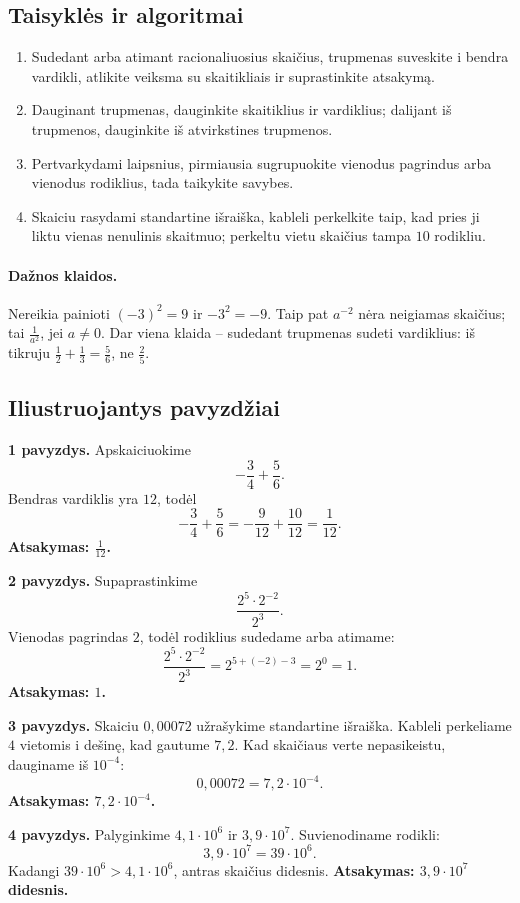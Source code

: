 \subsection{Taisyklės ir algoritmai}
\begin{enumerate}[label=\arabic*.]
\item Sudedant arba atimant racionaliuosius skaičius, trupmenas suveskite i bendra vardikli, atlikite veiksma su skaitikliais ir suprastinkite atsakymą.
\item Dauginant trupmenas, dauginkite skaitiklius ir vardiklius; dalijant iš trupmenos, dauginkite iš atvirkstines trupmenos.
\item Pertvarkydami laipsnius, pirmiausia sugrupuokite vienodus pagrindus arba vienodus rodiklius, tada taikykite savybes.
\item Skaiciu rasydami standartine išraiška, kableli perkelkite taip, kad pries ji liktu vienas nenulinis skaitmuo; perkeltu vietu skaičius tampa $10$ rodikliu.
\end{enumerate}
\paragraph{Dažnos klaidos.}
Nereikia painioti $(-3)^2=9$ ir $-3^2=-9$. Taip pat $a^{-2}$ nėra neigiamas skaičius; tai $\frac{1}{a^2}$, jei $a\ne0$. Dar viena klaida -- sudedant trupmenas sudeti vardiklius: iš tikruju $\frac12+\frac13=\frac56$, ne $\frac25$.

\subsection{Iliustruojantys pavyzdžiai}
\textbf{1 pavyzdys.} Apskaiciuokime
\[
-\frac34+\frac56.
\]
Bendras vardiklis yra $12$, todėl
\[
-\frac34+\frac56=-\frac9{12}+\frac{10}{12}=\frac1{12}.
\]
\textbf{Atsakymas: $\frac1{12}$.}

\textbf{2 pavyzdys.} Supaprastinkime
\[
\frac{2^5\cdot2^{-2}}{2^3}.
\]
Vienodas pagrindas $2$, todėl rodiklius sudedame arba atimame:
\[
\frac{2^5\cdot2^{-2}}{2^3}=2^{5+(-2)-3}=2^0=1.
\]
\textbf{Atsakymas: $1$.}

\textbf{3 pavyzdys.} Skaiciu $0{,}00072$ užrašykime standartine išraiška.
Kableli perkeliame $4$ vietomis i dešinę, kad gautume $7{,}2$. Kad skaičiaus verte nepasikeistu, dauginame iš $10^{-4}$:
\[
0{,}00072=7{,}2\cdot10^{-4}.
\]
\textbf{Atsakymas: $7{,}2\cdot10^{-4}$.}

\textbf{4 pavyzdys.} Palyginkime $4{,}1\cdot10^6$ ir $3{,}9\cdot10^7$.
Suvienodiname rodikli:
\[
3{,}9\cdot10^7=39\cdot10^6.
\]
Kadangi $39\cdot10^6>4{,}1\cdot10^6$, antras skaičius didesnis.
\textbf{Atsakymas: $3{,}9\cdot10^7$ didesnis.}

